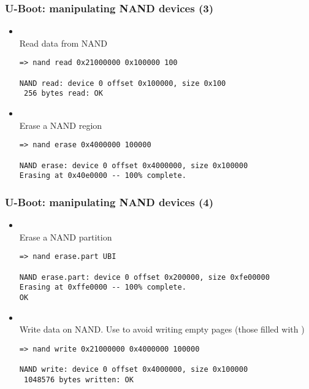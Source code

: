 \begin{frame}[fragile]
  \frametitle{U-Boot: manipulating NAND devices (3)}
  \begin{itemize}
  \item {}\\
    Read data from NAND
    \begin{block}{}
    \footnotesize
    \begin{verbatim}
=> nand read 0x21000000 0x100000 100

NAND read: device 0 offset 0x100000, size 0x100
 256 bytes read: OK
    \end{verbatim}
    \end{block}
  \item {}\\
    Erase a NAND region
    \begin{block}{}
    \footnotesize
    \begin{verbatim}
=> nand erase 0x4000000 100000

NAND erase: device 0 offset 0x4000000, size 0x100000
Erasing at 0x40e0000 -- 100% complete.
    \end{verbatim}
    \end{block}
  \end{itemize}
\end{frame}

\begin{frame}[fragile]
  \frametitle{U-Boot: manipulating NAND devices (4)}
  \begin{itemize}
  \item {}\\
    Erase a NAND partition
    \begin{block}{}
    \footnotesize
    \begin{verbatim}
=> nand erase.part UBI

NAND erase.part: device 0 offset 0x200000, size 0xfe00000
Erasing at 0xffe0000 -- 100% complete.
OK
    \end{verbatim}
    \end{block}
  \item {}\\
    Write data on NAND. Use  to avoid writing empty pages
    (those filled with )
    \begin{block}{}
    \footnotesize
    \begin{verbatim}
=> nand write 0x21000000 0x4000000 100000

NAND write: device 0 offset 0x4000000, size 0x100000
 1048576 bytes written: OK
    \end{verbatim}
    \end{block}
  \end{itemize}
\end{frame}


